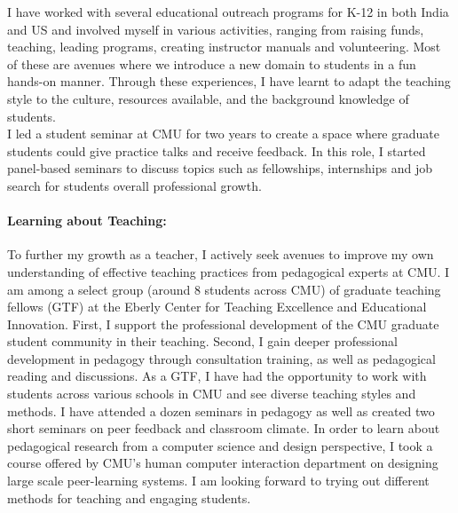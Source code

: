 \documentclass[10pt]{article}
\begin{document}
I have worked with several educational outreach programs for K-12 in both India and US and involved myself in various activities, ranging from raising funds, teaching, leading programs, creating instructor manuals and volunteering. Most of these are avenues where we introduce a new domain to students in a fun hands-on manner. Through these experiences, I have learnt to adapt the teaching style to the culture, resources available, and the background knowledge of students. \\

I led a student seminar at CMU for two years to create a space where graduate students could give practice talks and receive feedback. In this role, I started panel-based seminars to discuss topics such as fellowships, internships and job search for students overall professional growth. 

\paragraph{Learning about Teaching: }To further my growth as a teacher, I actively seek avenues to improve my own understanding of effective teaching practices from pedagogical experts at CMU. I am among a select group (around 8 students across CMU) of graduate teaching fellows (GTF) at the Eberly Center for Teaching Excellence and Educational Innovation. First, I support the professional development of the CMU graduate student community in their teaching. Second, I gain deeper professional development in pedagogy through consultation training, as well as pedagogical reading and discussions. 
As a GTF, I have had the opportunity to work with students across various schools in CMU and see diverse teaching styles and methods. I have attended a dozen seminars in pedagogy as well as created two short seminars on peer feedback and classroom climate. In order to learn about pedagogical research from a computer science and design perspective, I took a course offered by CMU's human computer interaction department on designing large scale peer-learning systems. %
I am looking forward to trying out different methods for teaching and engaging students. %
\end{document}
